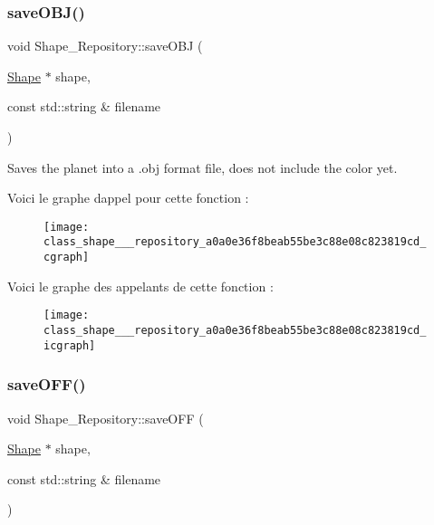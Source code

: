 \subsubsection{\texorpdfstring{save\+O\+B\+J()}{saveOBJ()}}
{\footnotesize\ttfamily void Shape\+\_\+\+Repository\+::save\+O\+BJ (\begin{DoxyParamCaption}\item[{\hyperlink{class_shape}{Shape} $\ast$}]{shape,  }\item[{const std\+::string \&}]{filename }\end{DoxyParamCaption})\hspace{0.3cm}{\ttfamily [static]}}



Saves the planet into a .obj format file, does not include the color yet. 

Voici le graphe d\textquotesingle{}appel pour cette fonction \+:
\nopagebreak
\begin{figure}[H]
\begin{center}
\leavevmode
\texttt{[image: class\_shape\_\_\_repository\_a0a0e36f8beab55be3c88e08c823819cd\_cgraph]}
\end{center}
\end{figure}
Voici le graphe des appelants de cette fonction \+:
\nopagebreak
\begin{figure}[H]
\begin{center}
\leavevmode
\texttt{[image: class\_shape\_\_\_repository\_a0a0e36f8beab55be3c88e08c823819cd\_icgraph]}
\end{center}
\end{figure}
\mbox{\label{class_shape___repository_ad52141b6883d20084a0105355f2271b5}} 
\subsubsection{\texorpdfstring{save\+O\+F\+F()}{saveOFF()}}
{\footnotesize\ttfamily void Shape\+\_\+\+Repository\+::save\+O\+FF (\begin{DoxyParamCaption}\item[{\hyperlink{class_shape}{Shape} $\ast$}]{shape,  }\item[{const std\+::string \&}]{filename }\end{DoxyParamCaption})\hspace{0.3cm}{\ttfamily [static]}}



